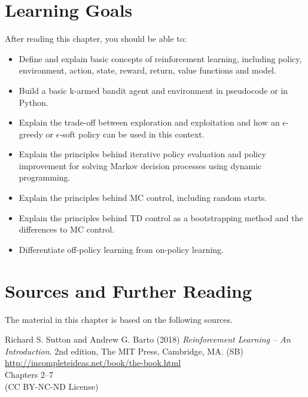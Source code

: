 %
%
\section*{Learning Goals}

After reading this chapter, you should be able to:
\begin{itemize}
    \item Define and explain basic concepts of reinforcement learning, including policy, environment, action, state, reward, return, value functions and model.
    \item Build a basic k-armed bandit agent and environment in pseudocode or in Python.
    \item  Explain the trade-off between exploration and exploitation and how an $\epsilon$-greedy or $\epsilon$-soft policy can be used in this context.
    \item Explain the principles behind iterative policy evaluation and policy improvement for solving Markov decision processes using dynamic programming.
    \item Explain the principles behind MC control, including random starts. 
    \item Explain the principles behind TD control as a bootstrapping method and the differences to MC control.   
    \item Differentiate off-policy learning from on-policy learning. 
\end{itemize}

\section*{Sources and Further Reading}

The material in this chapter is based on the following sources. 

\begin{resourcebox}
Richard S. Sutton and Andrew G. Barto (2018) \emph{Reinforcement Learning -- An Introduction}. 2nd edition, The MIT Press, Cambridge, MA. (SB) \\
\vspace{0.5\baselineskip}
\small\url{http://incompleteideas.net/book/the-book.html}\normalsize \\
\vspace{0.5\baselineskip}
Chapters 2--7 \\
\vspace{0.5\baselineskip}
(CC BY-NC-ND License)
\end{resourcebox}

